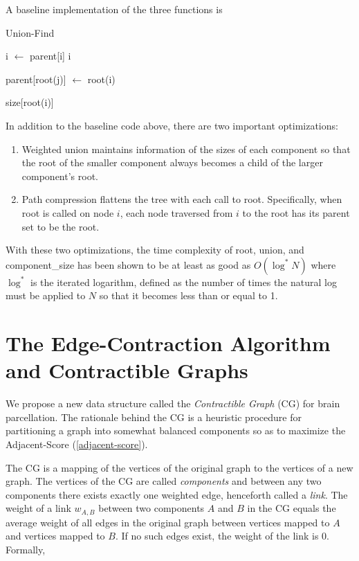 A baseline implementation of the three functions is

\begin{algorithm}
\caption{Union-Find}
\begin{algorithmic}

        \State i $\gets$ parent[i]
    \EndWhile
    \State \Return i
\EndFunction
\State 

    \State parent[root(j)] $\gets$ root(i)
\EndFunction
\State 

    \State \Return size[root(i)]
\EndFunction

\end{algorithmic}
\end{algorithm}

In addition to the baseline code above, there are two important
optimizations:

\begin{enumerate}[1.]
\item
Weighted union maintains information of the sizes of each component so
that the root of the smaller component always becomes a child of the
larger component's root.

\item
Path compression flattens the tree with each call to root. Specifically,
when root is called on node $i$, each node traversed from $i$ to the
root has its parent set to be the root.
\end{enumerate}

With these two optimizations, the time complexity of root, union, and
component\_size has been shown to be at least as good as $O(\log^* N)$
where $\log^*$ is the iterated logarithm, defined as the number of
times the natural log must be applied to $N$ so that it becomes less
than or equal to 1.

\section{The Edge-Contraction Algorithm and Contractible Graphs}

We propose a new data structure called the \textit{Contractible Graph}
(CG) for brain parcellation. The rationale behind the CG is a heuristic
procedure for partitioning a graph into somewhat balanced components
so as to maximize the Adjacent-Score (\ref{adjacent-score}).

The CG is a mapping of the vertices of the original graph to the
vertices of a new graph. The vertices of the CG are called
\textit{components} and between any two components there exists exactly
one weighted edge, henceforth called a \textit{link}. The weight
of a link $w_{A,B}$ between two components $A$ and $B$ in the CG equals
the average weight of all edges in the original graph between vertices
mapped to $A$ and vertices mapped to $B$. If no such edges exist,
the weight of the link is $0$. Formally,

